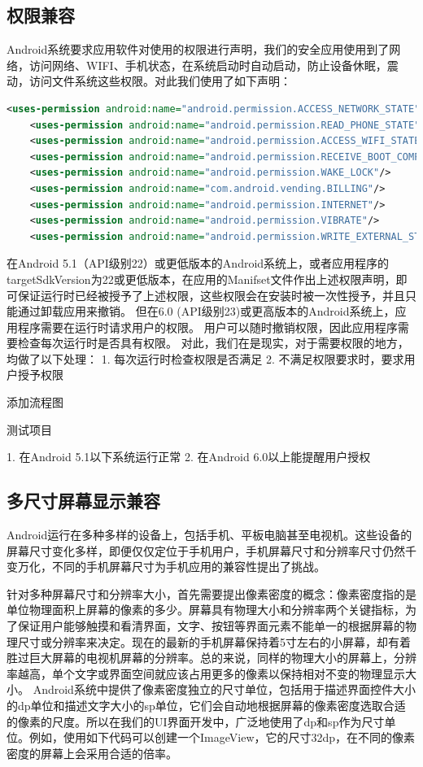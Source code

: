 \documentclass[format=final, language=chinese, degree=fyp]{hustthesis}
\begin{document}
\subsection{权限兼容}

Android系统要求应用软件对使用的权限进行声明，我们的安全应用使用到了网络，访问网络、WIFI、手机状态，在系统启动时自动启动，防止设备休眠，震动，访问文件系统这些权限。对此我们使用了如下声明：

\begin{lstlisting}[language=xml]
    <uses-permission android:name="android.permission.ACCESS_NETWORK_STATE"/>
    <uses-permission android:name="android.permission.READ_PHONE_STATE"/>
    <uses-permission android:name="android.permission.ACCESS_WIFI_STATE"/>
    <uses-permission android:name="android.permission.RECEIVE_BOOT_COMPLETED"/>
    <uses-permission android:name="android.permission.WAKE_LOCK"/>
    <uses-permission android:name="com.android.vending.BILLING"/>
    <uses-permission android:name="android.permission.INTERNET"/>
    <uses-permission android:name="android.permission.VIBRATE"/>
    <uses-permission android:name="android.permission.WRITE_EXTERNAL_STORAGE" />
\end{lstlisting}


在Android 5.1（API级别22）或更低版本的Android系统上，或者应用程序的targetSdkVersion为22或更低版本，在应用的Manifset文件作出上述权限声明，即可保证运行时已经被授予了上述权限，这些权限会在安装时被一次性授予，并且只能通过卸载应用来撤销。 但在6.0 (API级别23)或更高版本的Android系统上，应用程序需要在运行时请求用户的权限。 用户可以随时撤销权限，因此应用程序需要检查每次运行时是否具有权限。
对此，我们在是现实，对于需要权限的地方，均做了以下处理：
    1. 每次运行时检查权限是否满足
    2. 不满足权限要求时，要求用户授予权限

\todo 添加流程图


测试项目

1. 在Android 5.1以下系统运行正常
2. 在Android 6.0以上能提醒用户授权


\subsection{多尺寸屏幕显示兼容}


Android运行在多种多样的设备上，包括手机、平板电脑甚至电视机。这些设备的屏幕尺寸变化多样，即便仅仅定位于手机用户，手机屏幕尺寸和分辨率尺寸仍然千变万化，不同的手机屏幕尺寸为手机应用的兼容性提出了挑战。


针对多种屏幕尺寸和分辨率大小，首先需要提出像素密度的概念：像素密度指的是单位物理面积上屏幕的像素的多少。屏幕具有物理大小和分辨率两个关键指标，为了保证用户能够触摸和看清界面，文字、按钮等界面元素不能单一的根据屏幕的物理尺寸或分辨率来决定。现在的最新的手机屏幕保持着5寸左右的小屏幕，却有着胜过巨大屏幕的电视机屏幕的分辨率。总的来说，同样的物理大小的屏幕上，分辨率越高，单个文字或界面空间就应该占用更多的像素以保持相对不变的物理显示大小。
Android系统中提供了像素密度独立的尺寸单位，包括用于描述界面控件大小的dp单位和描述文字大小的sp单位，它们会自动地根据屏幕的像素密度选取合适的像素的尺度。所以在我们的UI界面开发中，广泛地使用了dp和sp作为尺寸单位。例如，使用如下代码可以创建一个ImageView，它的尺寸32dp，在不同的像素密度的屏幕上会采用合适的倍率。
\end{document}

